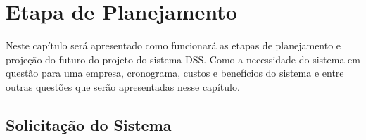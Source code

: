
\chapter{Etapa de Planejamento}

Neste capítulo será apresentado como funcionará as etapas de planejamento e projeção do futuro do projeto do sistema DSS. Como a necessidade do sistema em questão para uma empresa, cronograma, custos e benefícios do sistema e entre outras questões que serão apresentadas nesse capítulo.


\section{Solicita\c{c}\~{a}o do Sistema}
